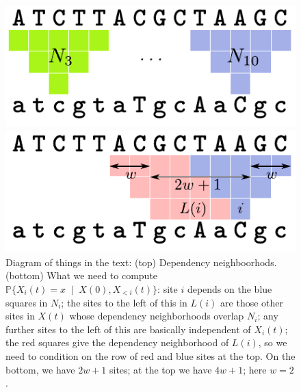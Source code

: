 \documentclass{article}
\renewcommand{\P}{\mathbb{P}}
\newcommand{\given}{\;\mid\;}
\theoremstyle{plain}
\theoremstyle{definition}
\begin{document}
\begin{figure}
    \begin{center}
        \includegraphics{context-neighborhoods-defns}

        \vspace{2em}

        \includegraphics{context-neighborhoods-widths}
    \end{center}
    \caption{
        Diagram of things in the text:
        (top) Dependency neighboorhods.
        (bottom) What we need to compute $\P\{X_i(t)=x \given X(0), X_{<i}(t)\}$:
        site $i$ depends on the blue squares in $N_i$;
        the sites to the left of this in $L(i)$ are those other sites in $X(t)$
        whose dependency neighborhoods overlap $N_i$;
        any further sites to the left of this are basically independent of $X_i(t)$;
        the red squares give the dependency neighborhood of $L(i)$,
        so we need to condition on the row of red and blue sites at the top.
        On the bottom, we have $2w+1$ sites; at the top we have $4w+1$;
        here $w=2$.
        \label{fig:neighborhoods}
    }
\end{figure}
\end{document}
